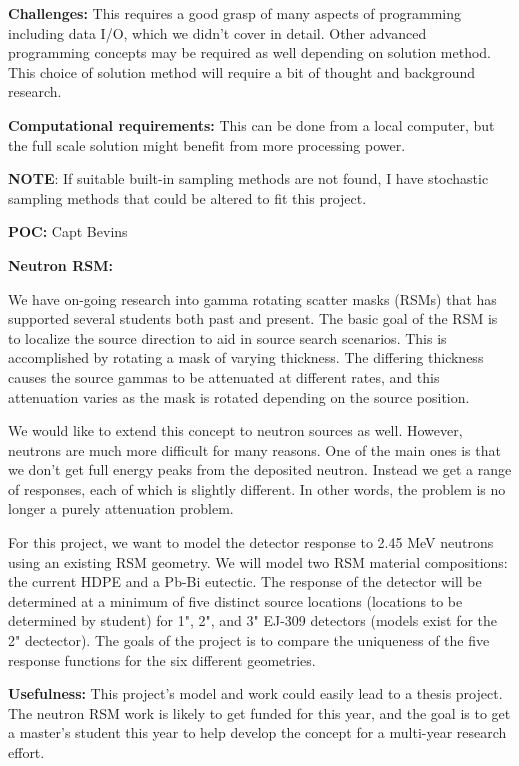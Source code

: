 \documentclass[12pt, answers]{exam}
\begin{document}
\begin{questions}
\textbf{Challenges:}
This requires a good grasp of many aspects of programming including data I/O, which we didn't cover in detail.
Other advanced programming concepts may be required as well depending on solution method.
This choice of solution method will require a bit of thought and background research.

\textbf{Computational requirements:}
This can be done from a local computer, but the full scale solution might benefit from more processing power.


\textbf{NOTE}: If suitable built-in sampling methods are not found, I have stochastic sampling methods that could be altered to fit this project. 

\textbf{POC:} Capt Bevins
  
\newpage
 

\question \textbf{Neutron RSM:}

We have on-going research into gamma rotating scatter masks (RSMs) that has supported several students both past and present.
The basic goal of the RSM is to localize the source direction to aid in source search scenarios.
This is accomplished by rotating a mask of varying thickness.  
The differing thickness causes the source gammas to be attenuated at different rates, and this attenuation varies as the mask is rotated depending on the source position.

We would like to extend this concept to neutron sources as well.  
However, neutrons are much more difficult for many reasons.  
One of the main ones is that we don't get full energy peaks from the deposited neutron.  Instead we get a range of responses, each of which is slightly different.  
In other words, the problem is no longer a purely attenuation problem.

For this project, we want to model the detector response to 2.45 MeV neutrons using an existing RSM geometry. 
We will model two RSM material compositions: the current HDPE and a Pb-Bi eutectic.
The response of the detector will be determined at a minimum of five distinct source locations (locations to be determined by student) for 1", 2", and 3" EJ-309 detectors (models exist for the 2" dectector).
The goals of the project is to compare the uniqueness of the five response functions for the six different geometries. 
 
\textbf{Usefulness:} 
This project's model and work could easily lead to a thesis project.  
The neutron RSM work is likely to get funded for this year, and the goal is to get a master's student this year to help develop the concept for a multi-year research effort.


\end{questions}
\end{document}
